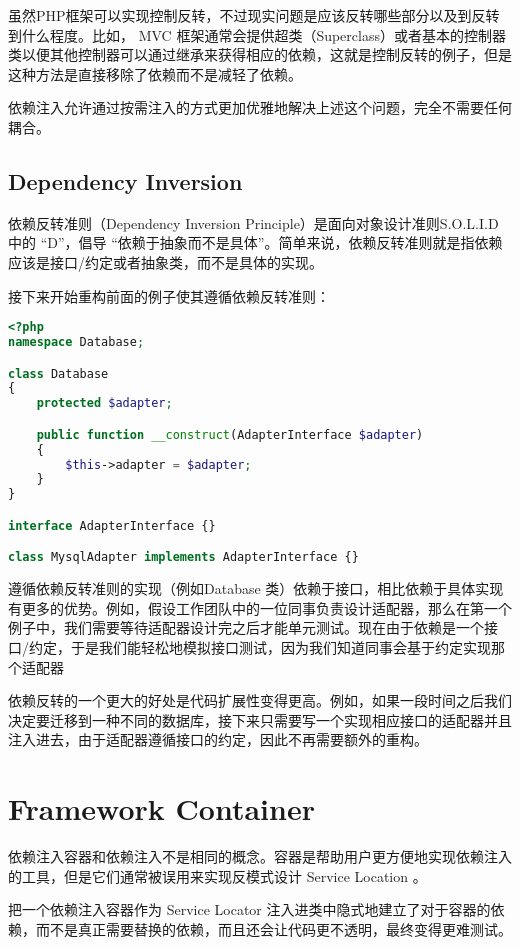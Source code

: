 虽然PHP框架可以实现控制反转，不过现实问题是应该反转哪些部分以及到反转到什么程度。比如， MVC 框架通常会提供超类（Superclass）或者基本的控制器类以便其他控制器可以通过继承来获得相应的依赖，这就是控制反转的例子，但是这种方法是直接移除了依赖而不是减轻了依赖。

依赖注入允许通过按需注入的方式更加优雅地解决上述这个问题，完全不需要任何耦合。

\subsection{Dependency Inversion}


依赖反转准则（Dependency Inversion Principle）是面向对象设计准则S.O.L.I.D中的 “D”，倡导 “依赖于抽象而不是具体”。简单来说，依赖反转准则就是指依赖应该是接口/约定或者抽象类，而不是具体的实现。

接下来开始重构前面的例子使其遵循依赖反转准则：



\begin{lstlisting}[language=PHP]
<?php
namespace Database;

class Database
{
    protected $adapter;

    public function __construct(AdapterInterface $adapter)
    {
        $this->adapter = $adapter;
    }
}

interface AdapterInterface {}

class MysqlAdapter implements AdapterInterface {}
\end{lstlisting}

遵循依赖反转准则的实现（例如Database 类）依赖于接口，相比依赖于具体实现有更多的优势。例如，假设工作团队中的一位同事负责设计适配器，那么在第一个例子中，我们需要等待适配器设计完之后才能单元测试。现在由于依赖是一个接口/约定，于是我们能轻松地模拟接口测试，因为我们知道同事会基于约定实现那个适配器

依赖反转的一个更大的好处是代码扩展性变得更高。例如，如果一段时间之后我们决定要迁移到一种不同的数据库，接下来只需要写一个实现相应接口的适配器并且注入进去，由于适配器遵循接口的约定，因此不再需要额外的重构。

\section{Framework Container}


依赖注入容器和依赖注入不是相同的概念。容器是帮助用户更方便地实现依赖注入的工具，但是它们通常被误用来实现反模式设计 Service Location 。

把一个依赖注入容器作为 Service Locator 注入进类中隐式地建立了对于容器的依赖，而不是真正需要替换的依赖，而且还会让代码更不透明，最终变得更难测试。


